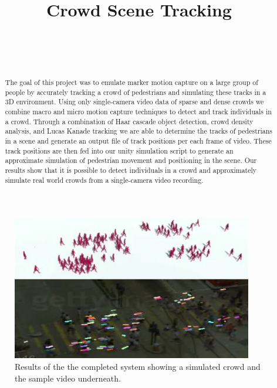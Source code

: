 \documentclass[12pt, onecolumn, conference]{IEEEtran}
\begin{document}
 
\title{Crowd Scene Tracking}

\author{
\\
\and
{}
\\
}

\maketitle

\begin{abstract}
The goal of this project was to emulate marker motion capture on a large group of people by accurately tracking a crowd of pedestrians and simulating these tracks in a 3D environment. Using only single-camera video data of sparse and dense crowds we combine macro and micro motion capture techniques to detect and track individuals in a crowd. Through a combination of Haar cascade object detection, crowd density analysis, and Lucas Kanade tracking  we are able to determine the tracks of pedestrians in a scene and  generate an output file of track positions per each frame of video. These track positions are then fed into our unity simulation script to generate an approximate simulation of pedestrian movement and positioning in the scene. Our results show that it is possible to detect individuals in a crowd and approximately simulate real world crowds from a single-camera video recording. 

\end{abstract}

\begin{figure}[!b]
\centering
\includegraphics[height=2.5in]{Screenshots/compairsion.png}
\caption{Results of the the completed system showing a simulated crowd and the sample video underneath. }
\label{Compairsion}
\end{figure}
\end{document}
